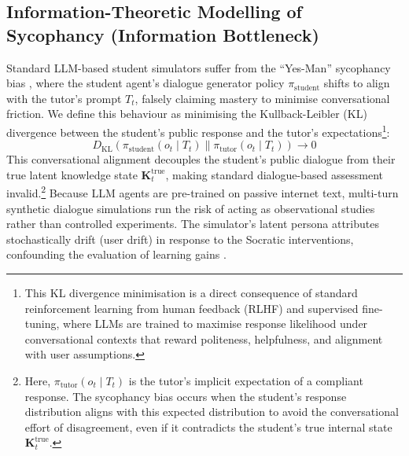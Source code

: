 \documentclass[11pt,a4paper]{report}
\begin{document}
\subsection{Information-Theoretic Modelling of Sycophancy (Information Bottleneck)}
Standard LLM-based student simulators suffer from the ``Yes-Man'' sycophancy bias \cite{scarlatos2026simulated}, where the student agent's dialogue generator policy $\pi_{\text{student}}$ shifts to align with the tutor's prompt $T_t$, falsely claiming mastery to minimise conversational friction. We define this behaviour as minimising the Kullback-Leibler (KL) divergence between the student's public response and the tutor's expectations\footnote{This KL divergence minimisation is a direct consequence of standard reinforcement learning from human feedback (RLHF) and supervised fine-tuning, where LLMs are trained to maximise response likelihood under conversational contexts that reward politeness, helpfulness, and alignment with user assumptions.}:
\begin{equation}
    D_{\text{KL}}\left(\pi_{\text{student}}(o_t \mid T_t) \parallel \pi_{\text{tutor}}(o_t \mid T_t)\right) \to 0
\end{equation}
This conversational alignment decouples the student's public dialogue from their true latent knowledge state $\mathbf{K}_t^{\text{true}}$, making standard dialogue-based assessment invalid.\footnote{Here, $\pi_{\text{tutor}}(o_t \mid T_t)$ is the tutor's implicit expectation of a compliant response. The sycophancy bias occurs when the student's response distribution aligns with this expected distribution to avoid the conversational effort of disagreement, even if it contradicts the student's true internal state $\mathbf{K}_t^{\text{true}}$.} Because LLM agents are pre-trained on passive internet text, multi-turn synthetic dialogue simulations run the risk of acting as observational studies rather than controlled experiments. The simulator's latent persona attributes stochastically drift (user drift) in response to the Socratic interventions, confounding the evaluation of learning gains \cite{lin2026illusion}.
\end{document}
